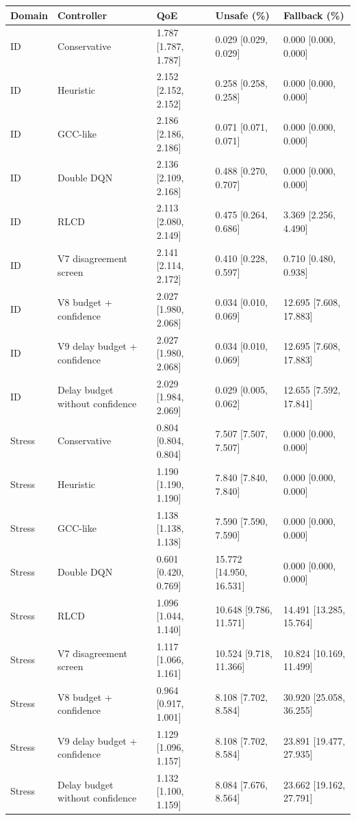 \begin{tabular}{lllll}
\toprule
Domain & Controller & QoE & Unsafe (\%) & Fallback (\%) \\
\midrule
ID & Conservative & 1.787 [1.787, 1.787] & 0.029 [0.029, 0.029] & 0.000 [0.000, 0.000] \\
ID & Heuristic & 2.152 [2.152, 2.152] & 0.258 [0.258, 0.258] & 0.000 [0.000, 0.000] \\
ID & GCC-like & 2.186 [2.186, 2.186] & 0.071 [0.071, 0.071] & 0.000 [0.000, 0.000] \\
ID & Double DQN & 2.136 [2.109, 2.168] & 0.488 [0.270, 0.707] & 0.000 [0.000, 0.000] \\
ID & RLCD & 2.113 [2.080, 2.149] & 0.475 [0.264, 0.686] & 3.369 [2.256, 4.490] \\
ID & V7 disagreement screen & 2.141 [2.114, 2.172] & 0.410 [0.228, 0.597] & 0.710 [0.480, 0.938] \\
ID & V8 budget + confidence & 2.027 [1.980, 2.068] & 0.034 [0.010, 0.069] & 12.695 [7.608, 17.883] \\
ID & V9 delay budget + confidence & 2.027 [1.980, 2.068] & 0.034 [0.010, 0.069] & 12.695 [7.608, 17.883] \\
ID & Delay budget without confidence & 2.029 [1.984, 2.069] & 0.029 [0.005, 0.062] & 12.655 [7.592, 17.841] \\
Stress & Conservative & 0.804 [0.804, 0.804] & 7.507 [7.507, 7.507] & 0.000 [0.000, 0.000] \\
Stress & Heuristic & 1.190 [1.190, 1.190] & 7.840 [7.840, 7.840] & 0.000 [0.000, 0.000] \\
Stress & GCC-like & 1.138 [1.138, 1.138] & 7.590 [7.590, 7.590] & 0.000 [0.000, 0.000] \\
Stress & Double DQN & 0.601 [0.420, 0.769] & 15.772 [14.950, 16.531] & 0.000 [0.000, 0.000] \\
Stress & RLCD & 1.096 [1.044, 1.140] & 10.648 [9.786, 11.571] & 14.491 [13.285, 15.764] \\
Stress & V7 disagreement screen & 1.117 [1.066, 1.161] & 10.524 [9.718, 11.366] & 10.824 [10.169, 11.499] \\
Stress & V8 budget + confidence & 0.964 [0.917, 1.001] & 8.108 [7.702, 8.584] & 30.920 [25.058, 36.255] \\
Stress & V9 delay budget + confidence & 1.129 [1.096, 1.157] & 8.108 [7.702, 8.584] & 23.891 [19.477, 27.935] \\
Stress & Delay budget without confidence & 1.132 [1.100, 1.159] & 8.084 [7.676, 8.564] & 23.662 [19.162, 27.791] \\
\bottomrule
\end{tabular}
